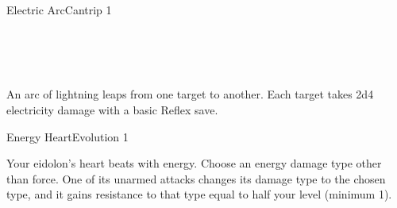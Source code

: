 \documentclass[12pt,openany,twocolumn]{book}
\begin{document}

\author{Jason Weatherly}

\begin{spell}{Electric Arc}{}{Cantrip 1}
    \begin{spellinfo}
         \\
         \\
         \\
    \end{spellinfo}

    \begin{spellbody}
        An arc of lightning leaps from one target to another. Each target takes 2d4 electricity damage with a basic Reflex save.
    \end{spellbody}


\end{spell}

\begin{feat}{Energy Heart}{Evolution 1}
    \begin{featinfo}
    \end{featinfo}

    \begin{featbody}
        Your eidolon's heart beats with energy. Choose an energy damage type other than force. One of its unarmed attacks changes its damage type to the chosen type, and it gains resistance to that type equal to half your level (minimum 1).
    \end{featbody}

\end{feat}
\end{document}
